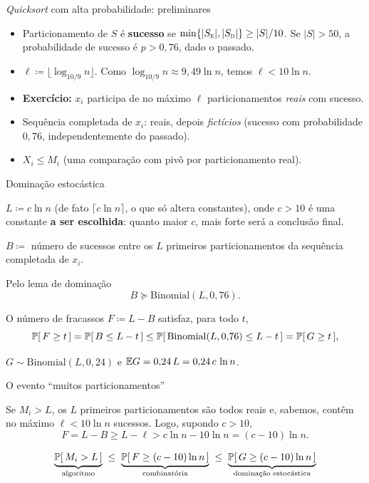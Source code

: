 \documentclass[aspectratio=169]{beamer}
\begin{document}
\begin{frame}{\emph{Quicksort} com alta probabilidade: preliminares}

  \begin{itemize}\itemsep=.43cm
  \item Particionamento de $S$ é \textbf{sucesso} se
    $\min\{|S_{\textsc{e}}|,|S_{\textsc{d}}|\}\geq|S|/10$. Se $|S|>50$,
    a probabilidade de sucesso é $p>0{,}76$, dado o passado.
  \item $\ell\coloneqq\lfloor\log_{10/9}n\rfloor$. Como
    $\log_{10/9}n\approx9{,}49\ln n$, temos $\ell<10\ln n$.
  \item \textbf{Exercício:} $x_i$ participa de no máximo $\ell$
    particionamentos \emph{reais} com sucesso.
  \item Sequência completada de $x_i$: reais, depois \emph{fictícios}
    (sucesso com probabilidade $0{,}76$, independentemente do passado).
    
  \item $X_i\leq M_i$ (uma comparação com pivô por particionamento real).
  \end{itemize}

\end{frame}
\begin{frame}{Dominação estocástica}

  $L \coloneqq c\ln n$ (de fato $\lceil c\ln n\rceil$, o que só altera
  constantes), onde $c>10$ é uma constante \textbf{a ser escolhida}:
  quanto maior $c$, mais forte será a conclusão final.

  \medskip

  $B \coloneqq$ número de sucessos entre os $L$ primeiros
  particionamentos da sequência completada de $x_i$.

  \vfill

  Pelo lema de dominação
  \[
    B\succeq\mathrm{Binomial}(L,0{,}76).
  \]

  \vfill

  O número de fracassos $F\coloneqq L-B$ satisfaz, para todo $t$,
  \[
    \ProbE{F \geq t}=\ProbE{B\leq L-t}
    \leq\ProbE{\mathrm{Binomial}(L,0{,}76)\leq L-t}
    =\ProbE{G\geq t},
  \]

  $G\sim\mathrm{Binomial}(L,0{,}24)$ e $\mathbb{E}{G}=0{,}24\,L=0{,}24\,c\,\ln n$.

\end{frame}
\begin{frame}{O evento ``muitos particionamentos''}

  Se $M_i>L$, os $L$ primeiros particionamentos são todos reais e,
  sabemos, contêm no máximo $\ell<10\ln n$ sucessos. Logo, supondo
  $c>10$,
  \[
    F=L-B\geq L-\ell>c\ln n-10\ln n=(c-10)\ln n.
  \]

  \vfill

  \[
    \underbrace{\ProbE{M_i>L}}_{\text{algoritmo}}
    \;\leq\;
    \underbrace{\ProbE{F \geq (c-10)\ln n}}_{\text{combinatória}}
    \;\leq\;
    \underbrace{\ProbE{G\geq (c-10)\ln n}}_{\text{dominação estocástica}}
  \]

\end{frame}
\end{document}
